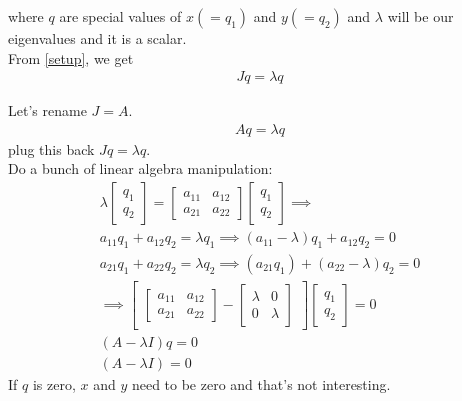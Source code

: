 \documentclass{article}
\begin{document}
where $q$ are special values of $x ( = q_1)$ and $y (= q_2)$ and $\lambda$ will be our eigenvalues and it is a scalar. \\

From \ref{setup}, we get 
\begin{align}
    Jq = \lambda q
\end{align}

Let's rename $J = A$. 
\begin{align}
    Aq = \lambda q
\end{align}
plug this back $Jq = \lambda q$. \\

Do a bunch of linear algebra manipulation: 
\begin{align}
    \lambda \begin{bmatrix}
        q_1\\
        q_2
\end{bmatrix} = \begin{bmatrix}
    a_{11} & a_{12}\\
    a_{21} & a_{22} 
\end{bmatrix} 
\begin{bmatrix}
        q_1\\
        q_2
\end{bmatrix} \implies \\
a_{11} q_1 + a_{12} q_2 = \lambda q_1 \implies  (a_{11} - \lambda) q_1 + a_{12} q_2 = 0 \\
a_{21} q_1 + a_{22} q_2 = \lambda q_2 \implies (a_{21} q_1) + (a_{22} - \lambda) q_2 = 0\\
\implies \begin{bmatrix}
    \begin{bmatrix}
        a_{11} & a_{12} \\
        a_{21} & a_{22}
    \end{bmatrix} - \begin{bmatrix}
        \lambda & 0 \\
        0 & \lambda
    \end{bmatrix}
\end{bmatrix} \begin{bmatrix}
    q_1 \\
    q_2
\end{bmatrix} = 0 \\
(A - \lambda I) q = 0 \label{vector} \\
(A - \lambda I) = 0 \label{det}
\end{align}
If $q$ is zero, $x$ and $y$ need to be zero and that's not interesting. \\
\end{document}
